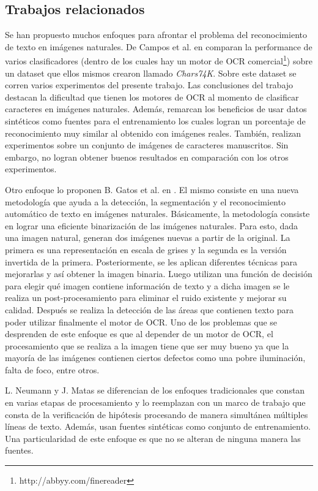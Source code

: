 \subsection{Trabajos relacionados}
	
	Se han propuesto muchos enfoques para afrontar el problema del reconocimiento de texto en imágenes naturales. De Campos et al. en \cite{dCBV09} comparan la performance de varios clasificadores (dentro de los cuales hay un motor de OCR comercial\footnote{http://abbyy.com/finereader}) sobre un dataset que ellos mismos crearon llamado \textit{Chars74K}. Sobre este dataset se corren varios experimentos del presente trabajo. Las conclusiones del trabajo destacan la dificultad que tienen los motores de OCR al momento de clasificar caracteres en imágenes naturales. Además, remarcan los beneficios de usar datos sintéticos como fuentes para el entrenamiento los cuales logran un porcentaje de reconocimiento muy similar al obtenido con imágenes reales. También, realizan experimentos sobre un conjunto de imágenes de caracteres manuscritos. Sin embargo, no logran obtener buenos resultados en comparación con los otros experimentos. 
	
	Otro enfoque lo proponen B. Gatos et al. en \cite{GPP03}. El mismo consiste en una nueva metodología que ayuda a la detección, la segmentación y el reconocimiento automático de texto en imágenes naturales. Básicamente, la metodología consiste en lograr una eficiente binarización de las imágenes naturales. Para esto, dada una imagen natural, generan dos imágenes nuevas a partir de la original. La primera es una representación en escala de grises y la segunda es la versión invertida de la primera. Posteriormente, se les aplican diferentes técnicas para mejorarlas y así obtener la imagen binaria. Luego utilizan una función de decisión para elegir qué imagen contiene información de texto y a dicha imagen se le realiza un post-procesamiento para eliminar el ruido existente y mejorar su calidad. Después se realiza la detección de las áreas que contienen texto para poder utilizar finalmente el motor de OCR. Uno de los problemas que se desprenden de este enfoque es que al depender de un motor de OCR, el procesamiento que se realiza a la imagen tiene que ser muy bueno ya que la mayoría de las imágenes contienen ciertos defectos como una pobre iluminación, falta de foco, entre otros.

	L. Neumann y J. Matas \cite{LNJM} se diferencian de los enfoques tradicionales que constan en varias etapas de procesamiento y lo reemplazan con un marco de trabajo que consta de la verificación de hipótesis procesando de manera simultánea múltiples líneas de texto. Además, usan fuentes sintéticas como conjunto de entrenamiento. Una particularidad de este enfoque es que no se alteran de ninguna manera las fuentes.
	
